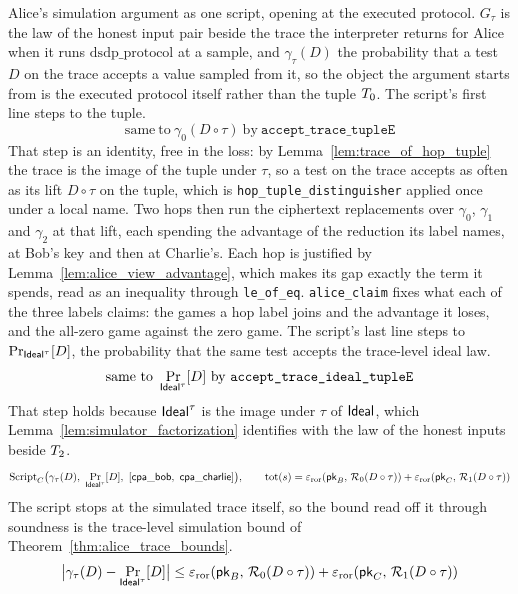 \begin{definition}
  \label{def:alice_trace_sim_script}
  \rocqok
  Alice's simulation argument as one script, opening at the executed protocol.
  $G_\tau$ is the law of the honest input pair beside the trace the interpreter
  returns for Alice when it runs $\mathrm{dsdp\_protocol}$ at a sample, and
  $\gamma_\tau(D)$ the probability that a test $D$ on the trace accepts a
  value sampled from it, so the object the argument starts from is the executed
  protocol itself rather than the tuple $T_{0}$. The script's first line
  steps to the tuple.
  \[ \mathrm{same\ to}\ \gamma_0(D \circ \tau)\ \mathrm{by}\
       \texttt{accept\_trace\_tupleE} \]
  That step is an identity, free in the loss: by
  Lemma~\ref{lem:trace_of_hop_tuple} the trace is the image of the tuple under
  $\tau$, so a test on the trace accepts as often as its lift
  $D \circ \tau$ on the tuple, which is
  \texttt{hop\_tuple\_distinguisher} applied once under a local name. Two hops
  then run the ciphertext replacements over $\gamma_0$, $\gamma_1$ and
  $\gamma_2$ at that lift, each spending the advantage of the reduction its
  label names, at Bob's key and then at Charlie's. Each hop is justified by
  Lemma~\ref{lem:alice_view_advantage}, which makes its gap exactly the term
  it spends, read as an inequality through \texttt{le\_of\_eq}.
  \texttt{alice\_claim} fixes what each of the three labels claims: the games
  a hop label joins and the advantage it loses, and the all-zero game against
  the zero game. The script's last line steps to $\Pr_{\mathsf{Ideal}^\tau}[D]$, the
  probability that the same test accepts the trace-level ideal law.
  \[ \mathrm{same\ to}\ \Pr_{\Ideal^\tau}[D]\ \mathrm{by}\
       \texttt{accept\_trace\_ideal\_tupleE} \]
  That step holds because $\mathsf{Ideal}^\tau$ is the image under
  $\tau$ of $\mathsf{Ideal}$, which Lemma~\ref{lem:simulator_factorization} identifies
  with the law of the honest inputs beside $T_{2}$.
  \[ \mathrm{Script}_C\big(\gamma_\tau(D),\ \Pr_{\Ideal^\tau}[D],\
       [\mathsf{cpa\_bob},\ \mathsf{cpa\_charlie}]\big),
     \qquad \mathrm{tot}(s) = \epshopsum{D \circ \tau} \]
  The script stops at the simulated trace itself, so the bound read off it
  through soundness is the trace-level simulation bound of
  Theorem~\ref{thm:alice_trace_bounds}.
  \[ \big\lvert \gamma_\tau(D) - \Pr_{\mathsf{Ideal}^\tau}[D] \big\rvert
       \le \varepsilon_{\mathrm{ror}}(\mathsf{pk}_B,\,\mathcal{R}_{0}(D \circ \tau)) + \varepsilon_{\mathrm{ror}}(\mathsf{pk}_C,\,\mathcal{R}_{1}(D \circ \tau)) \]
\end{definition}

